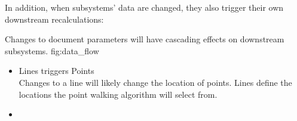 {\begin{itemize}
  \end{itemize}

  In addition, when subsystems' data are changed, they also trigger their own downstream recalculations:

  {Changes to document parameters will have cascading effects on downstream subsystems.}
  {fig:data_flow}

  \begin{itemize}
    \item Lines triggers Points \\
          Changes to a line will likely change the location of points.
          Lines define the locations the point walking algorithm will select from.

    \item
  \end{itemize}

}
